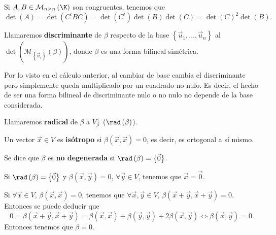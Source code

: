 Si $\displaystyle A,B \in \mathcal{M}_{ n \times n }\left(\K\right) $ son congruentes, tenemos que 
\[ \det\left(A\right) =\det\left(C^{t}BC\right) = \det\left(C^{t}\right)\det\left(B\right)\det\left(C\right) = \det\left(C\right)^{2}\det\left(B\right) .\]
\begin{fdefinition}[Discriminante]
	\normalfont Llamaremos \textbf{discriminante} de $\displaystyle \beta  $ respecto de la base $\displaystyle \left\{ \vec{u}_{1}, \ldots , \vec{u}_{n}\right\}  $ al $\displaystyle \det\left(\mathcal{M}_{ \left\{ \vec{u}_{i}\right\} }\left(\beta\right)\right) $, donde $\displaystyle \beta  $ es una forma bilineal simétrica.
\end{fdefinition}
\begin{observation}
\normalfont Por lo visto en el cálculo anterior, al cambiar de base cambia el discriminante pero simplemente queda multiplicado por un cuadrado no nulo. Es decir, el hecho de ser una forma bilineal de discriminante nulo o no nulo no depende de la base considerada.
\end{observation}
\begin{fdefinition}[Radical]
\normalfont Llamaremos \textbf{radical} de $\displaystyle \beta  $ a $\displaystyle V^{\perp }_{\beta } $ ($\displaystyle \rad\left(\beta\right) $).
\end{fdefinition}
\begin{fdefinition}[Isótropo]
\normalfont Un vector $\displaystyle \vec{x} \in V $ es \textbf{isótropo} si $\displaystyle \beta\left(\vec{x}, \vec{x}\right) = 0 $, es decir, es ortogonal a sí mismo.
\end{fdefinition}
\begin{fdefinition}[]
	\normalfont Se dice que $\displaystyle \beta  $ es \textbf{no degenerada} si $\displaystyle \rad\left(\beta \right) = \left\{ \vec{0}\right\}  $.
\end{fdefinition}
\begin{observation}
\normalfont Si $\displaystyle \rad\left(\beta \right) = \left\{ \vec{0}\right\}  $ y $\displaystyle \beta\left(\vec{x}, \vec{y}\right) = 0 $, $\displaystyle \forall \vec{y} \in V $, tenemos que $\displaystyle \vec{x} = \vec{0} $.
\end{observation}
\begin{observation}
\normalfont Si $\displaystyle \forall \vec{x} \in V $, $\displaystyle \beta\left(\vec{x}, \vec{x}\right)=0 $, tenemos que $\displaystyle \forall \vec{x}, \vec{y} \in V $, $\displaystyle \beta\left(\vec{x} + \vec{y}, \vec{x} + \vec{y}\right) =0$. Entonces se puede deducir que
\[ 0 = \beta\left(\vec{x} + \vec{y}, \vec{x} + \vec{y}\right) = \beta\left(\vec{x}, \vec{x}\right) + \beta\left(\vec{y} , \vec{y}\right) + 2 \beta\left(\vec{x}, \vec{y}\right) \iff \beta\left(\vec{x}, \vec{y}\right) = 0 .\]
Entonces tenemos que $\displaystyle \beta = 0 $.
\end{observation}
